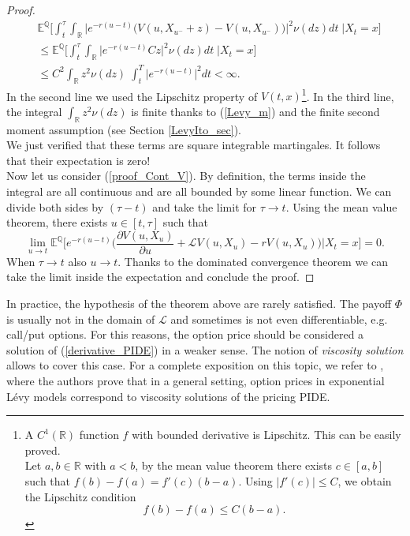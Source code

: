 \documentclass[a4paper,10pt]{article}
\newcommand{\numberset}{\mathbb}
\newcommand{\R}{\numberset{R}}
\newcommand{\E}{\numberset{E}}
\newcommand{\Q}{\numberset{Q}}
\newcommand{\LL}{\mathcal{L}}
\begin{document}
\begin{proof}
\begin{align*}
  & \E^{\Q} \biggl[ \int_t^{\tau} \int_{\R} \bigg| e^{-r(u-t)} \bigl( V(u,X_{u^-} + z) - V(u,X_{u^-}) \bigr) \bigg|^2 \nu(dz) dt \; \bigg| X_t=x \biggr]  \\
  & \leq \E^{\Q} \biggl[ \int_t^{\tau} \int_{\R} \bigg| e^{-r(u-t)} C z \bigg|^2 \nu(dz) dt \; \bigg| X_t=x \biggr]  \\
  & \leq C^2 \int_{\R} z^2 \nu(dz) \; \int_t^{T} \bigg| e^{-r(u-t)} \bigg|^2 dt < \infty. 
  \end{align*}
 In the second line we used the Lipschitz property of $V(t,x)$\footnote{A $C^1(\R)$ function $f$ with bounded derivative is Lipschitz. This can be easily proved.\\
 Let $a,b \in \R$ with $a<b$, by the mean value theorem there exists $c\in [a,b]$ such that $f(b)-f(a) = f'(c) (b-a)$. Using $|f'(c)|\leq C$, we obtain the Lipschitz condition
 $$ f(b)-f(a) \leq C (b-a). $$}.
  In the third line, the integral $\int_{\R} z^2 \nu(dz)$ is finite thanks to (\ref{Levy_m}) and the finite second moment assumption (see Section \ref{LevyIto_sec}).\\
  We just verified that these terms are square integrable martingales. It follows that their expectation is zero! \\
  
 Now let us consider (\ref{proof_Cont_V}).
 By definition, the terms inside the integral are all continuous and are all bounded by some linear function.
 We can divide both sides by $(\tau-t)$ and take the limit for $\tau \to t$. Using the mean value theorem, there exists $u \in [t,\tau]$ such that 
 $$ \lim_{u \to t} \E^{\Q} \biggl[ e^{-r(u-t)} \biggl( \frac{\partial V(u,X_u)}{\partial u} + \LL V(u,X_u) -r V(u,X_u) \biggr) \bigg| X_t=x \biggr] = 0. $$
 When $\tau\to t$ also $u\to t$. Thanks to the dominated convergence theorem we can take the limit inside the expectation and conclude the proof.
\end{proof}
In practice, the hypothesis of the theorem above are rarely satisfied. 
The payoff $\Phi$ is usually not in the domain of $\LL$ and sometimes is not even differentiable, e.g. call/put options.   
For this reasons, the option price should be considered a solution of (\ref{derivative_PIDE}) in a weaker sense. 
The notion of \emph{viscosity solution} allows to cover this case.
For a complete exposition on this topic, we refer to \cite{CoVo05}, where the authors prove that in a general setting,
option prices in exponential Lévy models correspond to viscosity solutions of the pricing PIDE.\\
\end{document}
